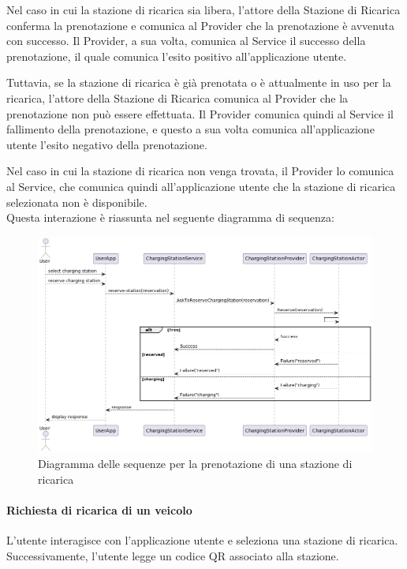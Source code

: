 Nel caso in cui la stazione di ricarica sia libera, l'attore della Stazione di Ricarica conferma la prenotazione e comunica al Provider che la prenotazione è avvenuta con successo. Il Provider, a sua volta, comunica al Service il successo della prenotazione, il quale comunica l'esito positivo all'applicazione utente.

Tuttavia, se la stazione di ricarica è già prenotata o è attualmente in uso per la ricarica, l'attore della Stazione di Ricarica comunica al Provider che la prenotazione non può essere effettuata. Il Provider comunica quindi al Service il fallimento della prenotazione, e questo a sua volta comunica all'applicazione utente l'esito negativo della prenotazione.

Nel caso in cui la stazione di ricarica non venga trovata, il Provider lo comunica al Service, che comunica quindi all'applicazione utente che la stazione di ricarica selezionata non è disponibile.\\

Questa interazione è riassunta nel seguente diagramma di sequenza:

\begin{figure}[htbp]
    \centering
    \includegraphics[width=\textwidth]{images/reserve-station.png}
    \caption{Diagramma delle sequenze per la prenotazione di una stazione di ricarica}
    \label{fig:reserve-station}
\end{figure}

\paragraph{Richiesta di ricarica di un veicolo}
L'utente interagisce con l'applicazione utente  e seleziona una stazione di ricarica. Successivamente, l'utente legge un codice QR associato alla stazione.

